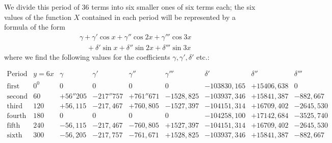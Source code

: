 We divide this period of \(36\) terms into six smaller ones of six terms each; the six values of the function \(X\) contained in each period will be represented by a formula of the form
\[
\begin{aligned}
&\gamma+\gamma'\cos x+\gamma''\cos 2x+\gamma'''\cos 3x\\[6pt]
&\quad+\delta'\sin x+\delta''\sin 2x+\delta'''\sin 3x
\end{aligned}
\]
where we find the following values for the coefficients \(\gamma,\gamma',\delta'\) etc.:


\begin{landscape}\thispagestyle{empty}\begingroup\fontsize{9}{12}\selectfont\setlength{\arraycolsep}{3pt}\renewcommand{\arraystretch}{1.3}
\[
\begin{array}{l|r|r|r|r|r|r|r|r}
\text{Period}&y=6x&\gamma&\gamma'&\gamma''&\gamma'''&\delta'&\delta''&\delta'''\\ \hline
\text{first}&0^{\mathord{0}}&0&0&0&0&
-103830{,}165&
+15406{,}638&0\\
\text{second}&60&+56''205&-217''757&+761''671&-1528{,}825&-103937{,}346&+15841{,}387&-882{,}667\\
\text{third}&120&+56{,}115&-217{,}467&+760{,}805&-1527{,}397&-104151{,}314&+16709{,}402&-2645{,}530\\
\text{fourth}&180&0&0&0&0&-104258{,}100&+17142{,}684&-3525{,}740\\
\text{fifth}&240&-56{,}115&-217{,}467&-760{,}805&+1527{,}397&-104151{,}314&+16709{,}402&-2645{,}530\\
\text{sixth}&300&-56{,}205&-217{,}757&-761{,}671&+1528{,}825&-103937{,}346&+15841{,}387&-882{,}667
\end{array}
\]
\endgroup\end{landscape}


